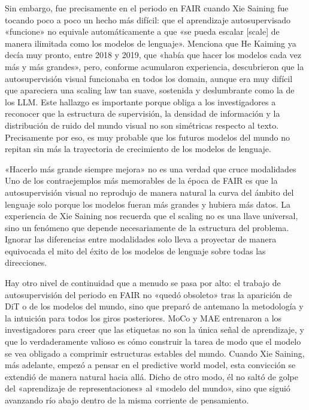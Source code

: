 Sin embargo, fue precisamente en el periodo en FAIR cuando Xie Saining fue tocando poco a poco un hecho más difícil: que el aprendizaje autosupervisado «funcione» no equivale automáticamente a que «se pueda escalar [scale] de manera ilimitada como los modelos de lenguaje». Menciona que He Kaiming ya decía muy pronto, entre 2018 y 2019, que «había que hacer los modelos cada vez más y más grandes», pero, conforme acumularon experiencia, descubrieron que la autosupervisión visual funcionaba en todos los domain, aunque era muy difícil que apareciera una scaling law tan suave, sostenida y deslumbrante como la de los LLM. Este hallazgo es importante porque obliga a los investigadores a reconocer que la estructura de supervisión, la densidad de información y la distribución de ruido del mundo visual no son simétricas respecto al texto. Precisamente por eso, es muy probable que los futuros modelos del mundo no repitan sin más la trayectoria de crecimiento de los modelos de lenguaje.

\begin{warningbox}{«Hacerlo más grande siempre mejora» no es una verdad que cruce modalidades}
Uno de los contraejemplos más memorables de la época de FAIR es que la autosupervisión visual no reprodujo de manera natural la curva del ámbito del lenguaje solo porque los modelos fueran más grandes y hubiera más datos. La experiencia de Xie Saining nos recuerda que el scaling no es una llave universal, sino un fenómeno que depende necesariamente de la estructura del problema. Ignorar las diferencias entre modalidades solo lleva a proyectar de manera equivocada el mito del éxito de los modelos de lenguaje sobre todas las direcciones.
\end{warningbox}

Hay otro nivel de continuidad que a menudo se pasa por alto: el trabajo de autosupervisión del periodo en FAIR no «quedó obsoleto» tras la aparición de DiT o de los modelos del mundo, sino que preparó de antemano la metodología y la intuición para todos los giros posteriores. MoCo y MAE entrenaron a los investigadores para creer que las etiquetas no son la única señal de aprendizaje, y que lo verdaderamente valioso es cómo construir la tarea de modo que el modelo se vea obligado a comprimir estructuras estables del mundo. Cuando Xie Saining, más adelante, empezó a pensar en el predictive world model, esta convicción se extendió de manera natural hacia allá. Dicho de otro modo, él no saltó de golpe del «aprendizaje de representaciones» al «modelo del mundo», sino que siguió avanzando río abajo dentro de la misma corriente de pensamiento.


